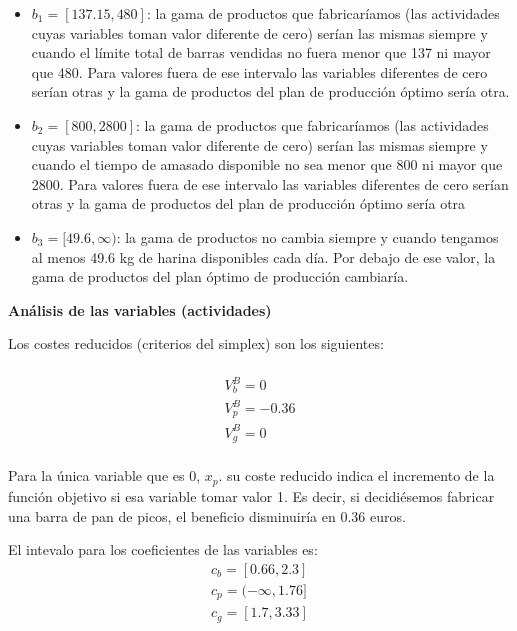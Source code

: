 \begin{itemize}
    \item $b_1 = [137.15, 480]$: la gama de productos que fabricaríamos (las actividades cuyas variables toman valor diferente de cero) serían las mismas siempre y cuando el límite total de barras vendidas no fuera menor que 137 ni mayor que 480. Para valores fuera de ese intervalo las variables diferentes de cero serían otras y la gama de productos del plan de producción óptimo sería otra.
    \item $b_2 = [800, 2800]$: la gama de productos que fabricaríamos (las actividades cuyas variables toman valor diferente de cero) serían las mismas siempre y cuando el tiempo de amasado disponible no sea menor que 800 ni mayor que 2800. Para valores fuera de ese intervalo las variables diferentes de cero serían otras y la gama de productos del plan de producción óptimo sería otra
    \item $b_3 = [49.6, \infty)$: la gama de productos no cambia siempre y cuando tengamos al menos 49.6 kg de harina disponibles cada día. Por debajo de ese valor, la gama de productos del plan óptimo de producción cambiaría.
\end{itemize}    


\textbf{Análisis de las variables (actividades)}

Los costes reducidos (criterios del simplex) son los siguientes:
\\
\\
\begin{equation}
\begin{split}
    V^B_b = 0\\
    V^B_p = -0.36\\
    V^B_g = 0\\
\end{split}    
\end{equation}

Para la única variable que es 0, $x_p$. su coste reducido indica el incremento de la función objetivo si esa variable tomar valor 1. Es decir, si decidiésemos fabricar una barra de pan de picos, el beneficio disminuiría en 0.36 euros.

El intevalo para los coeficientes de las variables es: 
\begin{equation}
\begin{split}
    c_b = [0.66, 2.3]\\
    c_p = (-\infty, 1.76]\\
    c_g = [1.7, 3.33]\\
\end{split}    
\end{equation}

